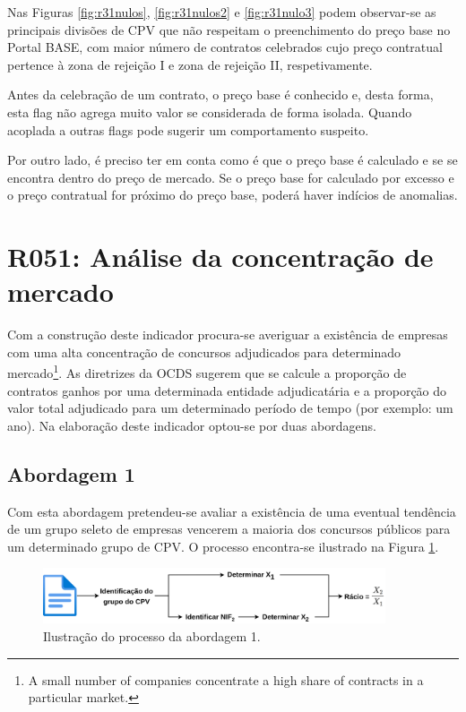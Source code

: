 Nas Figuras \ref{fig:r31nulos}, \ref{fig:r31nulos2} e \ref{fig:r31nulo3} podem observar-se as principais divisões de CPV que não respeitam o preenchimento do preço base no Portal BASE, com maior número de contratos celebrados cujo preço contratual pertence à zona de rejeição I e zona de rejeição II, respetivamente.

Antes da celebração de um contrato, o preço base é conhecido e, desta forma,  esta flag não agrega muito valor se considerada de forma isolada. Quando acoplada a outras flags pode sugerir um comportamento suspeito. 

Por outro lado, é preciso ter em conta como é que o preço base é calculado e se se encontra dentro do preço de mercado. Se o preço base for calculado por excesso e o preço contratual for próximo do preço base, poderá haver indícios de anomalias.





\section{R051: Análise da concentração de mercado}


Com a construção deste indicador procura-se averiguar a existência de empresas com uma alta concentração de concursos adjudicados para determinado mercado\footnote{A small number of companies concentrate a high share of contracts in a particular market.}. 
As diretrizes da OCDS sugerem que se calcule a proporção de contratos ganhos por uma determinada entidade adjudicatária e a proporção do valor total adjudicado para um determinado período de tempo (por exemplo: um ano). Na elaboração deste indicador optou-se por duas abordagens.





\subsection{Abordagem 1}

Com esta abordagem pretendeu-se avaliar a existência  de uma eventual tendência de um grupo seleto de empresas vencerem a maioria dos concursos públicos para um determinado grupo de CPV. O processo encontra-se ilustrado na Figura \ref{fig:ab1}. 

\begin{figure}[H]
	\centering
	\includegraphics[width=0.9\textwidth]{imagens/r51/r51_v2.png}
	\caption{Ilustração do processo da abordagem 1.}
\label{fig:ab1}
\end{figure}

